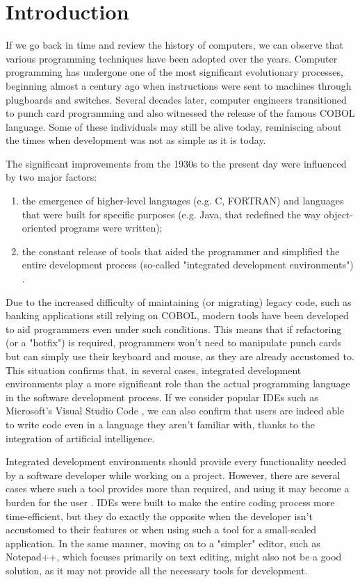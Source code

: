\chapter{Introduction}
\thispagestyle{pagestyle}

If we go back in time and review the history of computers, we can observe that various programming techniques have been adopted over the years. Computer programming has undergone one of the most significant evolutionary processes, beginning almost a century ago when instructions were sent to machines through plugboards and switches. Several decades later, computer engineers transitioned to punch card programming and also witnessed the release of the famous COBOL language. Some of these individuals may still be alive today, reminiscing about the times when development was not as simple as it is today.

The significant improvements from the 1930s to the present day were influenced by two major factors:

\begin{enumerate}
  \item the emergence of higher-level languages (e.g. C, FORTRAN) and languages that were built for specific purposes (e.g. Java, that redefined the way object-oriented programs were written);
  \item the constant release of tools that aided the programmer and simplified the entire development process (so-called "integrated development environments") \cite{ide_bigbang}.
\end{enumerate}

Due to the increased difficulty of maintaining (or migrating) legacy code, such as banking applications still relying on COBOL, modern tools have been developed to aid programmers even under such conditions. This means that if refactoring (or a "hotfix") is required, programmers won't need to manipulate punch cards but can simply use their keyboard and mouse, as they are already accustomed to. This situation confirms that, in several cases, integrated development environments play a more significant role than the actual programming language in the software development process. If we consider popular IDEs such as Microsoft's Visual Studio Code \cite{vscode}, we can also confirm that users are indeed able to write code even in a language they aren't familiar with, thanks to the integration of artificial intelligence.

Integrated development environments should provide every functionality needed by a software developer while working on a project. However, there are several cases where such a tool provides more than required, and using it may become a burden for the user \cite{ide_productivity}. IDEs were built to make the entire coding process more time-efficient, but they do exactly the opposite when the developer isn't accustomed to their features or when using such a tool for a small-scaled application. In the same manner, moving on to a "simpler" editor, such as Notepad++, which focuses primarily on text editing, might also not be a good solution, as it may not provide all the necessary tools for development.

